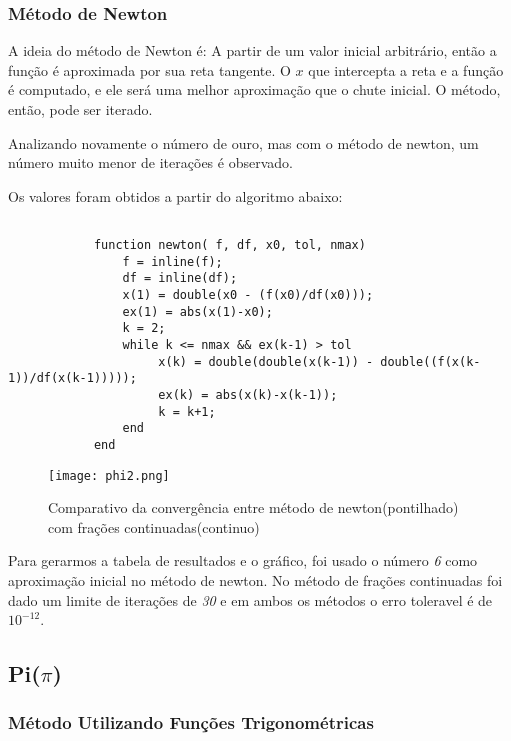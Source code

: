 		\subsubsection{Método de Newton}

			A ideia do método de Newton é: A partir de um valor inicial
			arbitrário, então a função é aproximada por sua reta tangente. O $x$
			que intercepta a reta e a função é computado, e ele será uma melhor
			aproximação que o chute inicial. O método, então, pode ser iterado.

			Analizando novamente o número de ouro, mas com o método de newton,
			um número muito menor de iterações é observado.

			

			Os valores foram obtidos a partir do algoritmo abaixo:

			\begin{lstlisting}

			function newton( f, df, x0, tol, nmax)
				f = inline(f);
				df = inline(df);
				x(1) = double(x0 - (f(x0)/df(x0)));
				ex(1) = abs(x(1)-x0);
				k = 2;
				while k <= nmax && ex(k-1) > tol
					 x(k) = double(double(x(k-1)) - double((f(x(k-1))/df(x(k-1)))));
					 ex(k) = abs(x(k)-x(k-1));
					 k = k+1;
				end
			end

			\end{lstlisting}

			\begin{figure}[H]
				\centering
				\texttt{[image: phi2.png]}
				\caption{Comparativo da convergência entre método de newton(pontilhado) com frações continuadas(continuo)}
				\label{fig:phi-graphic}
			\end{figure}

			Para gerarmos a tabela de resultados e o gráfico, foi usado o número
			\emph{6} como aproximação inicial no método de newton. No método de
			frações continuadas foi dado um limite de iterações de \emph{30} e
			em ambos os métodos o erro toleravel é de $10^{-12}$.

	\subsection{Pi($\pi$)}

		\subsubsection{Método Utilizando Funções Trigonométricas}

